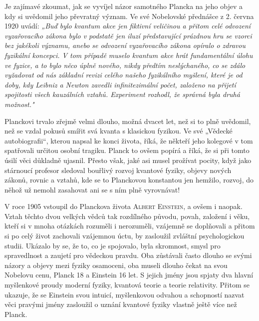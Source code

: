         Je zajímavé zkoumat, jak se vyvíjel názor samotného Plancka na jeho objev a kdy si uvědomil
        jeho převratný význam. Ve své Nobelovské přednášce z 2. června 1920 uvádí: \emph{„Buď bylo
        kvantum akce jen fiktivní veličinou a přitom celé odvození vyzařovacího zákona bylo v
        podstatě jen iluzí představující prázdnou hru se vzorci bez jakékoli významu, anebo se
        odvození vyzařovacího zákona opíralo o zdravou fyzikální koncepci. V tom případě muselo
        kvantum akce hrát fundamentální úlohu ve fyzice, a to bylo něco úplně nového, nikdy předtím
        neslýchaného, co se zdálo vyžadovat od nás základní revizi celého našeho fyzikálního
        myšlení, které je od doby, kdy Leibniz a Newton zavedli infinitezimální počet, založeno na
        přijetí spojitosti všech kauzálních vztahů. Experiment rozhodl, že správná byla druhá
        možnost."}

        Planckovi trvalo zřejmě velmi dlouho, možná dvacet let, než si to plně uvědomil, než se
        vzdal pokusů smířit svá kvanta s klasickou fyzikou. Ve své „Vědecké autobiografii“, kterou
        napsal ke konci života, říká, že někteří jeho kolegové v tom spatřovali určitou osobní
        tragiku. Planck to ovšem popírá a říká, že si při tomto úsilí věci důkladně ujasnil. Přesto
        však, jaké asi musel prožívat pocity, když jako stárnoucí profesor sledoval bouřlivý rozvoj
        kvantové fyziky, objevy nových zákonů, rovnic a vztahů, kde se to Planckovou konstantou jen
        hemžilo, rozvoj, do něhož už nemohl zasahovat ani se s ním plně vyrovnávat!

        V roce 1905 vstoupil do Planckova života \textsc{Albert Einstein}, a ovšem i naopak. Vztah
        těchto dvou velkých vědců tak rozdílného původu, povah, založení i věku, kteří si v mnoha
        otázkách rozuměli i nerozuměli, vzájemně se doplňovali a přitom si po celý život zachovali
        vzájemnou úctu, by zasloužil zvláštní psychologickou studii. Ukázalo by se, že to, co je
        spojovalo, byla skromnost, smysl pro spravedlnost a zaujetí pro vědeckou pravdu. Oba
        zůstávali často dlouho se svými názory a objevy mezi fyziky osamoceni, oba museli dlouho
        čekat na svou Nobelovu cenu, Planck 18 a Einstein 16 let. S jejich jmény jsou spjaty dva
        hlavní myšlenkové proudy moderní fyziky, kvantová teorie a teorie relativity. Přitom se
        ukazuje, že se Einstein svou intuicí, myšlenkovou odvahou a schopností nazvat věci pravými
        jmény zasloužil o uznání kvantové fyziky vlastně ještě více než Planck.

